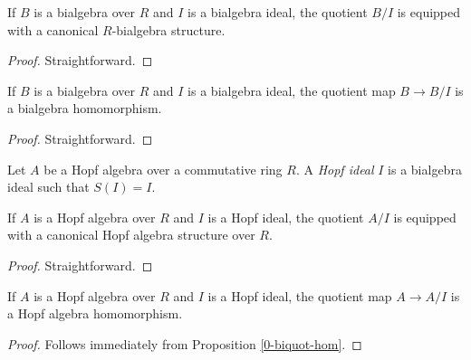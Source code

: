 \begin{proposition}
  \label{0-biquot}

  If $B$ is a bialgebra over $R$ and $I$ is a bialgebra ideal,
  the quotient $B / I$ is equipped with a canonical $R$-bialgebra structure.
\end{proposition}
\begin{proof}

  Straightforward.
\end{proof}


\begin{proposition}
  \label{0-biquot-hom}

  If $B$ is a bialgebra over $R$ and $I$ is a bialgebra ideal,
  the quotient map $B \to B / I$ is a bialgebra homomorphism.
\end{proposition}
\begin{proof}

  Straightforward.
\end{proof}


\begin{definition}
  \label{0-hopf-ideal}

  Let $A$ be a Hopf algebra over a commutative ring $R$.
  A \emph{Hopf ideal} $I$ is a bialgebra ideal such that $S(I)=I$.
\end{definition}

\begin{proposition}
  \label{0-hopf-quot}

  If $A$ is a Hopf algebra over $R$ and $I$ is a Hopf ideal,
  the quotient $A / I$ is equipped with a canonical Hopf algebra structure over $R$.
\end{proposition}
\begin{proof}

  Straightforward.
\end{proof}


\begin{proposition}
  \label{0-hopf-quot-hom}

  If $A$ is a Hopf algebra over $R$ and $I$ is a Hopf ideal,
  the quotient map $A \to A / I$ is a Hopf algebra homomorphism.
\end{proposition}
\begin{proof}

  Follows immediately from Proposition \ref{0-biquot-hom}.
\end{proof}


